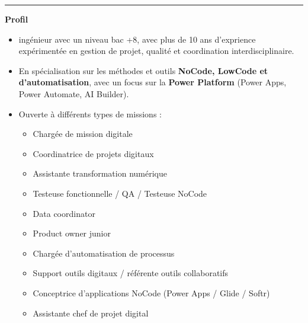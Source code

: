 \documentclass[11pt,a4paper]{article}
\newcommand{\cvsection}[1]{%
  \vspace{0pt}
  \noindent
  \textcolor{accentcolor}{\rule{2cm}{1.5pt}}\hspace{0.5em}
  {\large\bfseries\color{accentcolor}#1}
  \vspace{0.5em}
  \par\nobreak
}
\begin{document}
\cvsection{Profil}
\begin{itemize}
    \item ingénieur avec un niveau bac +8, avec plus de 10 ans d'exprience  expérimentée en gestion de projet, qualité et coordination interdisciplinaire.
       \item En spécialisation sur les méthodes et outils \textbf{NoCode, LowCode et d’automatisation}, avec un focus sur la \textbf{Power Platform} (Power Apps, Power Automate, AI Builder).
       \item Ouverte à différents types de missions :
    \begin{itemize}
        \item Chargée de mission digitale
        \item Coordinatrice de projets digitaux
        \item Assistante transformation numérique
        \item Testeuse fonctionnelle / QA / Testeuse NoCode
        \item Data coordinator
        \item Product owner junior
        \item Chargée d'automatisation de processus
        \item Support outils digitaux / référente outils collaboratifs
        \item Conceptrice d'applications NoCode (Power Apps / Glide / Softr)
        \item Assistante chef de projet digital
    \end{itemize}
  \end{itemize}
\end{document}
